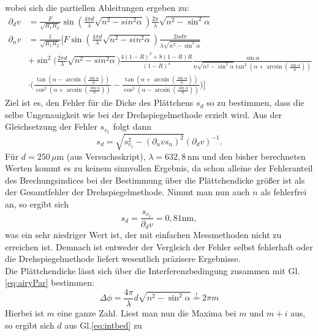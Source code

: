 wobei sich die partiellen Ableitungen ergeben zu:
\begin{align*}
    \partial_dv &= \frac{F}{\sqrt{R_1R_2}}\sin(\frac{4\pi d}{\lambda}\sqrt{n^2-sin^2\alpha})\frac{2\pi}{\lambda}\sqrt{n^2-\sin^2\alpha}\\
    \partial_nv &= \frac{1}{\sqrt{R_1R_2}} \Bigg[ F \sin(\frac{4\pi d}{\lambda}\sqrt{n^2-sin^2\alpha})\frac{2nd\pi}{\lambda \sqrt{n^2-\sin^2\alpha}}\\
    &+ \sin^2\biggl(\frac{2\pi d}{\lambda}\sqrt{n^2-sin^2\alpha} \biggl ) \frac{4(1-R)^2+8(1-R)R}{(1-R)^4} \frac{\sin\alpha}{n\sqrt{n^2-\sin^2\alpha}\tan^2(\alpha+ \arcsin(\frac{\sin\alpha}{n}))}\\
    &\cdot \biggl (\frac{\tan(\alpha - \arcsin(\frac{\sin\alpha}{n}))}{\cos^2(\alpha + \arcsin(\frac{\sin\alpha}{n}))} - \frac{\tan(\alpha+ \arcsin(\frac{\sin\alpha}{n}))}{\cos^2(\alpha - \arcsin(\frac{\sin\alpha}{n}))} \biggl ) \Bigg]
\end{align*}
Ziel ist es, den Fehler für die Dicke des Plättchens $s_d$ so zu bestimmen, dass die selbe Ungenauigkeit wie bei der Drehspiegelmethode erzielt wird. Aus der Gleichsetzung der 
Fehler $s_{v_1}$ folgt dann 
\begin{equation*}
    s_d = \sqrt{s_{v_1}^2 - (\partial_nvs_n)^2}(\partial_dv)^{-1}.
\end{equation*}
Für $d = 250\,\mu$m (aus Versuchsskript), $\lambda = 632,8\,$nm und den bisher berechneten Werten 
kommt es zu keinem sinnvollen Ergebnis, da schon alleine der Fehleranteil des Brechungsindices bei der Bestimmung über die Plättchendicke größer ist als der 
Gesamtfehler der Drehspiegelmethode. Nimmt man nun auch $n$ als fehlerfrei an, so ergibt sich 
\begin{equation*}
    s_d = \frac{s_{v_1}}{\partial_dv} = 0,81 \mathrm{nm},
\end{equation*}
was ein sehr niedriger Wert ist, der mit einfachen Messmethoden nicht zu erreichen ist. Demnach ist entweder der Vergleich der Fehler selbst fehlerhaft oder die Drehspiegelmethode 
liefert wesentlich präzisere Ergebnisse.\\
Die Plättchendicke lässt sich über die Interferenzbedingung zusammen mit Gl.\ref{eq:airyPar} bestimmen:
\begin{equation}
    \Delta \phi = \frac{4\pi}{\lambda}d\sqrt{n^2-\sin^2\alpha} \overset{!}{=} 2\pi m 
    \label{eq:intbed}
\end{equation}
Hierbei ist $m$ eine ganze Zahl. Liest man nun die Maxima bei $m$ und $m+i$ aus, so ergibt sich $d$ aus Gl.\ref{eq:intbed} zu 
